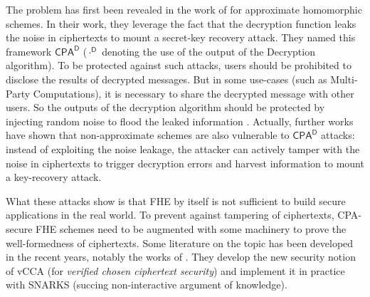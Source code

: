 The problem has first been revealed in the work of \cite{EC:LiMic21} for approximate homomorphic schemes. In their work, they leverage the fact that the decryption function leaks the noise in ciphertexts to mount a secret-key recovery attack. They named this framework $\textsf{CPA}^\textsf{D}$ ($\cdot ^ \textsf{D}$ denoting the use of the output of the Decryption algorithm). To be protected against such attacks, users should be prohibited to disclose the results of decrypted messages. But in some use-cases (such as Multi-Party Computations), it is necessary to share the decrypted message with other users. So the outputs of the decryption algorithm should be protected by injecting random noise to flood the leaked information \cite{EPRINT:CheHonKim20}. Actually, further works \cite{C:CSBB24, CCS:CCPSS24} have shown that non-approximate schemes are also vulnerable to $\textsf{CPA}^\textsf{D}$ attacks: instead of exploiting the noise leakage, the attacker can actively tamper with the noise in ciphertexts to trigger decryption errors and harvest information to mount a key-recovery attack.


What these attacks show is that FHE by itself is not sufficient to build secure applications in the real world. To prevent against tampering of ciphertexts, \textsf{CPA}-secure FHE schemes need to be augmented with some machinery to prove the well-formedness of ciphertexts. Some literature on the topic has been developed in the recent years, notably the works of \cite{EC:ManNgu24, CiC:BCFPPR25}. They develop the new security notion of \textsf{vCCA} (for \textit{verified chosen ciphertext security}) and implement it in practice with SNARKS \cite{SNARKS} (succing non-interactive argument of knowledge). 


